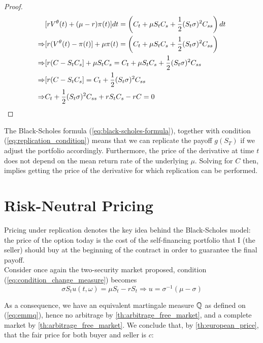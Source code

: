 \documentclass[../TGMAFFIRO.tex]{subfiles}
\begin{document}
\begin{proof}
	\begin{align}
		&[rV^\theta(t) + (\mu - r) \pi(t)] dt = \left(C_t + \mu S_t C_s + \frac{1}{2}(S_t\sigma)^2C_{ss} \right) dt\nonumber\\
		\Rightarrow & [r(V^\theta(t) - \pi(t)] + \mu\pi(t) = \left(C_t + \mu S_t C_s + \frac{1}{2}(S_t\sigma)^2C_{ss} \right) \nonumber\\
		\Rightarrow &[r(C - S_t C_s] + \mu S_t C_s = C_t + \mu S_t C_s + \frac{1}{2}(S_t\sigma)^2C_{ss} \nonumber \\
		\Rightarrow &[r(C - S_t C_s] = C_t + \frac{1}{2}(S_t\sigma)^2C_{ss} \nonumber \\
		\Rightarrow & C_t + \frac{1}{2}(S_t\sigma)^2C_{ss} + rS_t C_s - rC = 0
	\end{align}
 \end{proof}
 
 \begin{remark}
 	The Black-Scholes formula (\ref{eq:black-scholes-formula}), together with condition (\ref{eq:replication_condition}) means that we can replicate the payoff $g(S_T)$ if we adjust the portfolio accordingly. Furthermore, the price of the derivative at time $t$ does not depend on the mean return rate of the underlying $\mu$. Solving for $C$ then, implies getting the price of the derivative for which replication can be performed.
 \end{remark}
 
 \section{Risk-Neutral Pricing}
  Pricing under replication denotes the key idea behind the Black-Scholes model: the price of the option today is the cost of the self-financing portfolio that I (the seller) should buy at the beginning of the contract in order to guarantee the final payoff.\\
 
  Consider once again the two-security market proposed, condition (\ref{eq:condition_change_measure}) becomes
\[
	\sigma S_t u(t,\omega) = \mu S_t - r S_t \Rightarrow u = \sigma^{-1}(\mu - \sigma)
\]


As a consequence, we have an equivalent martingale measure $\mathbb{Q}$ as defined on (\ref{eq:emmq}), hence no arbitrage by \ref{th:arbitrage_free_market}, and a complete market by \ref{th:arbitrage_free_market}. We conclude that, by \ref{th:european_price}, that the fair price for both buyer and seller is $c$:
\end{document}
